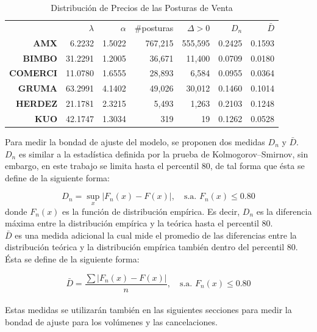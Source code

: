 \documentclass[11pt]{article}
\numberwithin{equation}{section} %
\begin{document}
\begin{table}[htbp]
\centering
\caption{Distribución de Precios de las Posturas de Venta}
\renewcommand{\arraystretch}{1.2}
\begin{tabular}{r|r|r|r|r|r|r|}
\cline{2-7}
& $\lambda$ & $\alpha$ & \#posturas & $\Delta>0$ & $D_n$ & $\bar{D}$  \\
\cline{2-7}
\textbf{AMX}   & 6.2232 & 1.5022 & 767,215 & 555,595 & 0.2425 & 0.1593 \\
\textbf{BIMBO} & 31.2291 & 1.2005 & 36,671 & 11,400 & 0.0709 & 0.0180 \\
\textbf{COMERCI}   & 11.0780 & 1.6555 & 28,893 & 6,584 & 0.0955 & 0.0364 \\
\textbf{GRUMA} & 63.2991 & 4.1402 & 49,026 & 30,012 & 0.1460 & 0.1014 \\
\textbf{HERDEZ} & 21.1781 & 2.3215 & 5,493 & 1,263 & 0.2103 & 0.1248 \\
\textbf{KUO}   & 42.1747 & 1.3034 & 319   & 19 & 0.1262 & 0.0528 \\
\cline{2-7}
\end{tabular}%
\label{tab:powerventa}%
\end{table}%

Para medir la bondad de ajuste del modelo, se proponen dos medidas $D_n$ y $\bar{D}$. $D_n$ es similar a la estadística definida por la prueba de Kolmogorov–Smirnov, sin embargo, en este trabajo se limita hasta el percentil 80, de tal forma que ésta se define de la siguiente forma:

\[
D_n=\sup_x |F_n(x)-F(x)|,\quad \text{s.a. } F_n(x)\leq 0.80
\]
donde $F_n(x)$ es la función de distribución empírica. Es decir, $D_n$ es la diferencia máxima entre la distribución empírica y la teórica hasta el percentil 80.\\

$\bar{D}$ es una medida adicional la cual mide el promedio de las diferencias entre la distribución teórica y la distribución empírica también dentro del percentil 80. Ésta se define de la siguiente forma:

\[
\bar{D}=\frac{\sum |F_n(x)-F(x)|}{n},\quad \text{s.a. } F_n(x)\leq 0.80
\]\\

Estas medidas se utilizarán también en las siguientes secciones para medir la bondad de ajuste para los volúmenes y las cancelaciones.\\
\end{document}
